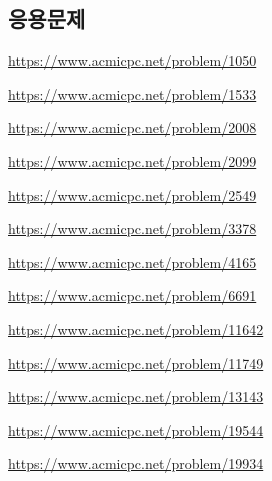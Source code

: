 \subsection{응용문제}
\begin{problem} \url{https://www.acmicpc.net/problem/1050} \end{problem}
\begin{problem} \url{https://www.acmicpc.net/problem/1533} \end{problem}
\begin{problem} \url{https://www.acmicpc.net/problem/2008} \end{problem}
\begin{problem} \url{https://www.acmicpc.net/problem/2099} \end{problem}
\begin{problem} \url{https://www.acmicpc.net/problem/2549} \end{problem}
\begin{problem} \url{https://www.acmicpc.net/problem/3378} \end{problem}
\begin{problem} \url{https://www.acmicpc.net/problem/4165} \end{problem}
\begin{problem} \url{https://www.acmicpc.net/problem/6691} \end{problem}
\begin{problem} \url{https://www.acmicpc.net/problem/11642} \end{problem}
\begin{problem} \url{https://www.acmicpc.net/problem/11749} \end{problem}
\begin{problem} \url{https://www.acmicpc.net/problem/13143} \end{problem}
\begin{problem} \url{https://www.acmicpc.net/problem/19544} \end{problem}
\begin{problem} \url{https://www.acmicpc.net/problem/19934} \end{problem}


